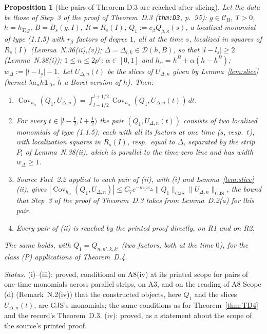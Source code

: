 \documentclass[11pt,a4paper]{article}
\newcommand{\CH}{\mathcal{C}_{\mathrm H}}
\DeclareMathOperator{\Cov}{Cov}
\newcommand{\GJS}[1]{\lVert #1\rVert_{\mathrm{GJS}}}
\theoremstyle{plain}
\newtheorem{tprop}[tlemma]{Proposition}
\theoremstyle{definition}
\begin{document}
\begin{tprop}[the pairs of Theorem D.3 are reached after slicing]\label{prop:N39}
Let the data be those of Step~3 of the proof of Theorem~D.3 (\texttt{thm:D3}, p.~95): $g\in\CH$,
$T>0$, $h=h_{T,g}$, $B=B_s(g,I)$, $R=R_s(I)$; $Q_1:=c_\beta Q_{\beta,\kappa}(s)$, a localized
monomial of type (1.1.5) with $r_\beta$ factors of degree $1$, all at the time $s$, localized in
squares of $R_s(I)$ (Lemma~N.36(ii),(v)); $\Delta=\Delta_{l,k}\in\mathcal D(h,B)$, so that
$|l-l_s|\ge2$ (Lemma~N.38(i)); $1\le n\le2p'$; $\alpha\in[0,1]$ and $h_\alpha=h^B+\alpha(h-h^B)$;
$w_\Delta:=|l-l_s|-1$.  Let $U_{\Delta,n}(t)$ be the slices of $U_{\Delta,n}$ given by
Lemma~\ref{lem:slice} (kernel $\lambda a_n\tilde h\mathbf 1_\Delta$, $\tilde h$ a Borel version of
$h$).  Then:
\begin{enumerate}
\item[\rm(i)] $\Cov_{h_\alpha}(Q_1,U_{\Delta,n})=\int_{l-1/2}^{l+1/2}\Cov_{h_\alpha}(Q_1,U_{\Delta,n}(t))\,dt$.
\item[\rm(ii)] For every $t\in[l-\frac12,l+\frac12)$ the pair $(Q_1,U_{\Delta,n}(t))$ consists
of two localized monomials of type (1.1.5), each with all its factors at one time ($s$, resp.\
$t$), with localization squares in $R_s(I)$, resp.\ equal to $\Delta$, separated by the strip
$P_l$ of Lemma~N.38(ii), which is parallel to the time-zero line and has width $w_\Delta\ge1$.
\item[\rm(iii)] Source Fact~2.2 applied to each pair of (ii), with (i) and
Lemma~\ref{lem:slice}(ii), gives
$|\Cov_{h_\alpha}(Q_1,U_{\Delta,n})|\le C_7e^{-m_1w_\Delta}\GJS{Q_1}\GJS{U_{\Delta,n}}$, the bound
that Step~3 of the proof of Theorem~D.3 takes from Lemma~D.2(a) for this pair.
\item[\rm(iv)] Every pair of (ii) is reached by the printed proof directly, on R1 and on R2.
\end{enumerate}
The same holds, with $Q_1=Q_{n,n',k,k'}$ (two factors, both at the time $0$), for the class (P)
applications of Theorem~D.4.
\end{tprop}

\emph{Status.}  (i)--(iii): proved, conditional on A8(iv) at its printed scope for pairs of
one-time monomials across parallel strips, on A3, and on the reading of A8 Scope (d)
(Remark~N.2(iv)) that the constructed objects, here $Q_1$ and the slices $U_{\Delta,n}(t)$, are
GJS's monomials; the same conditions as for Theorem~\ref{thm:TD4} and the record's
Theorem~D.3.  (iv): proved, as a statement about the scope of the source's printed proof.
\end{document}
